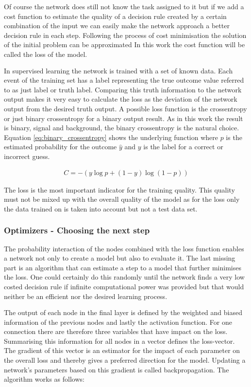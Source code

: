 Of course the network does still not know the task assigned to it but if we add a cost function to estimate the quality of a decision rule created by a certain combination of the input we can easily make the network approach a better decision rule in each step. Following the process of cost minimisation the solution of the initial problem can be approximated
In this work the cost function will be called the loss of the model.

In supervised learning the network is trained with a set of known data. Each event of the training set has a label representing the true outcome value referred to as just label or truth label. Comparing this truth information to the network output makes it very easy to calculate the loss as the deviation of the network output from the desired truth output. A possible loss function is the crossentropy or just binary crossentropy for a binary output result. As in this work the result is binary, signal and background, the binary crossentropy is the natural choice. Equation \eqref{eq:binary_crossentropy} shows the underlying function where $p$ is the estimated probability for the outcome $\hat{y}$ and $y$ is the label for a  correct or incorrect guess.

\begin{align}
    C = -(y \log p + (1 - y) \log (1 - p) )
    \label{eq:binary_crossentropy}
\end{align}

The loss is the most important indicator for the training quality. This quality must not be mixed up with the overall quality of the model as for the loss only the data trained on is taken into account but not a test data set.

\subsubsection{Optimizers - Choosing the next step}

The probability interaction of the nodes combined with the loss function enables a network not only to create a model but also to evaluate it. The last missing part is an algorithm that can estimate a step to a model that further minimises the loss. One could certainly do this randomly until the network finds a very low costed decision rule if infinite computational power was provided but that would neither be an efficient nor the desired learning process.

The output of each node in the final layer is defined by the weighted and biased information of the previous nodes and lastly the activation function. For one connection there are therefore three variables that have impact on the loss. Summarising this information for all nodes in a vector defines the loss-vector. The gradient of this vector is an estimator for the impact of each parameter on the overall loss and thereby gives a preferred direction for the model. Updating a network's parameters based on this gradient is called backpropagation. The algorithm works as follows:

